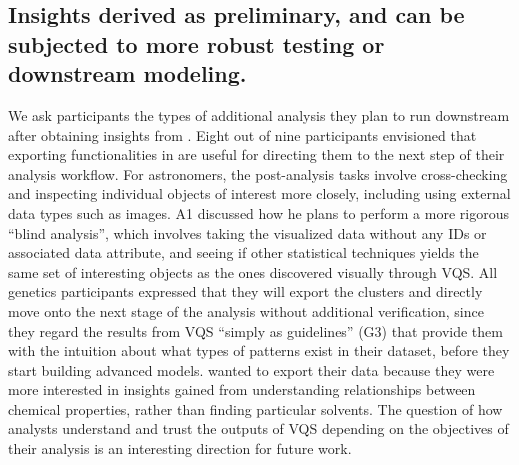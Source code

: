 \subsection{Insights derived as preliminary, and can be subjected to more robust testing or downstream modeling.}
\par We ask participants the types of additional analysis they plan to run downstream after obtaining insights from \ourVQS. Eight out of nine participants envisioned that exporting functionalities in \zv are useful for directing them to the next step of their analysis workflow. For astronomers, the post-analysis tasks involve cross-checking and inspecting individual objects of interest more closely, including using external data types such as images. A1 discussed how he plans to perform a more rigorous ``blind analysis'', which involves taking the visualized data without any IDs or associated data attribute, and seeing if other statistical techniques yields the same set of interesting objects as the ones discovered visually through VQS. All genetics participants expressed that they will export the clusters and directly move onto the next stage of the analysis without additional verification, since they regard the results from VQS ``simply as guidelines'' (G3) that provide them with the intuition about what types of patterns exist in their dataset, before they start building advanced models.  wanted to export their data because they were more interested in insights gained from understanding relationships between chemical properties, rather than finding particular solvents. The question of how analysts understand and trust the outputs of VQS depending on the objectives of their analysis is an interesting direction for future work.